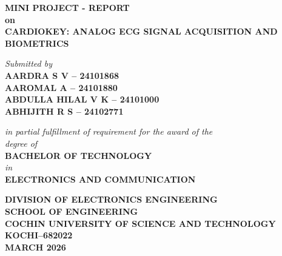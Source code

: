 \documentclass[12pt,a4paper]{report}
\begin{document}

\begin{titlepage}
\begin{center}

\vspace*{0.5cm} %

\Large \textbf{MINI PROJECT - REPORT}\\[0.3cm]
\large \textbf{on}\\[0.3cm]
\LARGE \textbf{CARDIOKEY: ANALOG ECG SIGNAL ACQUISITION AND BIOMETRICS}

\vfill

\large \textit{Submitted by}\\[0.4cm]
{\large \textbf{AARDRA S V – 24101868}\\ \textbf{AAROMAL A – 24101880}\\ \textbf{ABDULLA HILAL V K – 24101000}\\ \textbf{ABHIJITH R S – 24102771}}

\vfill

\textit{in partial fulfillment of requirement for the award of the}\\[0.2cm]
\textit{degree of}\\[0.4cm]
\Large \textbf{BACHELOR OF TECHNOLOGY}\\[0.2cm]
\large \textit{in}\\[0.2cm]
\Large \textbf{ELECTRONICS AND COMMUNICATION}

\vspace{1cm} %



\vfill

\large \textbf{DIVISION OF ELECTRONICS ENGINEERING}\\ \textbf{SCHOOL OF ENGINEERING}\\ \textbf{COCHIN UNIVERSITY OF SCIENCE AND TECHNOLOGY}\\ \textbf{KOCHI--682022}\\[0.4cm]
\textbf{MARCH 2026}

\end{center}
\end{titlepage}
\end{document}
